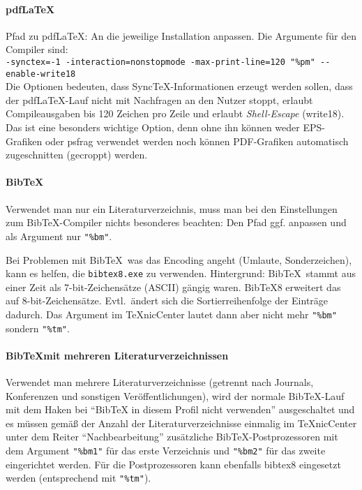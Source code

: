 \paragraph{pdf\LaTeX} Pfad zu pdf\LaTeX: An die jeweilige Installation anpassen. Die Argumente für den Compiler sind:\\ {\tiny \verb+-synctex=-1 -interaction=nonstopmode -max-print-line=120 "%pm" --enable-write18+}\\
Die Optionen bedeuten, dass Sync\TeX-Informationen erzeugt werden sollen, dass der pdf\LaTeX-Lauf nicht mit Nachfragen an den Nutzer stoppt, erlaubt Compileausgaben bis 120 Zeichen pro Zeile und erlaubt \emph{Shell-Escape} (write18). Das ist eine besonders wichtige Option, denn ohne ihn können weder EPS-Grafiken oder psfrag verwendet werden noch können PDF-Grafiken automatisch zugeschnitten (gecroppt) werden.

\paragraph{Bib\TeX}
Verwendet man nur ein Literaturverzeichnis, muss man bei den Einstellungen zum Bib\TeX-Compiler nichts besonderes beachten: Den Pfad ggf. anpassen und als Argument nur \verb+"%bm"+.

Bei Problemen mit Bib\TeX\ was das Encoding angeht (Umlaute, Sonderzeichen), kann es helfen, die \texttt{bibtex8.exe} zu verwenden. Hintergrund: Bib\TeX\ stammt aus einer Zeit als 7-bit-Zeichensätze (ASCII) gängig waren. BibTeX8 erweitert das auf 8-bit-Zeichensätze. Evtl.\ ändert sich die Sortierreihenfolge der Einträge dadurch. Das Argument im TeXnicCenter lautet dann aber nicht mehr \verb+"%bm"+ sondern \verb+"%tm"+.

\paragraph{Bib\TeX mit mehreren Literaturverzeichnissen}
Verwendet man mehrere Literaturverzeichnisse (\zb getrennt nach Journals, Konferenzen und sonstigen Veröffentlichungen), wird der normale BibTeX-Lauf mit dem Haken bei \enquote{BibTeX in diesem Profil nicht verwenden} ausgeschaltet und es müssen gemäß der Anzahl der Literaturverzeichnisse einmalig im TeXnicCenter unter dem Reiter \enquote{Nachbearbeitung} zusätzliche Bib\TeX-Postprozessoren mit dem Argument \verb+"%bm1"+ für das erste Verzeichnis und \verb+"%bm2"+ für das zweite \usw eingerichtet werden. Für die Postprozessoren kann ebenfalls bibtex8 eingesetzt werden (entsprechend mit \verb+"%tm"+).

